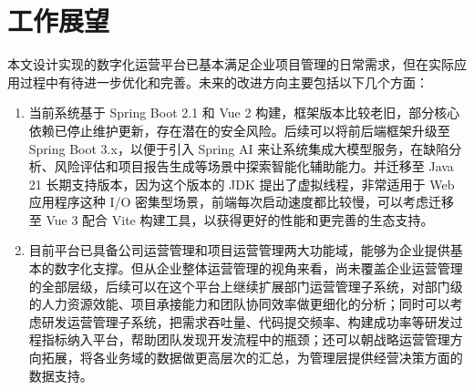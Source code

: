 \section{工作展望}
本文设计实现的数字化运营平台已基本满足企业项目管理的日常需求，但在实际应用过程中有待进一步优化和完善。未来的改进方向主要包括以下几个方面：
\begin{enumerate}[label=(\arabic*)]
	\item
	当前系统基于 Spring Boot 2.1 和 Vue 2 构建，框架版本比较老旧，部分核心依赖已停止维护更新，存在潜在的安全风险。后续可以将前后端框架升级至 Spring Boot 3.x，以便于引入 Spring AI 来让系统集成大模型服务，在缺陷分析、风险评估和项目报告生成等场景中探索智能化辅助能力。并迁移至 Java 21 长期支持版本，因为这个版本的 JDK 提出了虚拟线程，非常适用于 Web 应用程序这种 I/O 密集型场景，前端每次启动速度都比较慢，可以考虑迁移至 Vue 3 配合 Vite 构建工具，以获得更好的性能和更完善的生态支持。
	
	\item
	目前平台已具备公司运营管理和项目运营管理两大功能域，能够为企业提供基本的数字化支撑。但从企业整体运营管理的视角来看，尚未覆盖企业运营管理的全部层级，后续可以在这个平台上继续扩展部门运营管理子系统，对部门级的人力资源效能、项目承接能力和团队协同效率做更细化的分析；同时可以考虑研发运营管理子系统，把需求吞吐量、代码提交频率、构建成功率等研发过程指标纳入平台，帮助团队发现开发流程中的瓶颈；还可以朝战略运营管理方向拓展，将各业务域的数据做更高层次的汇总，为管理层提供经营决策方面的数据支持。
\end{enumerate}